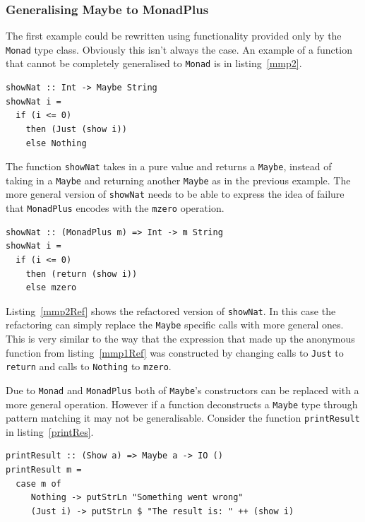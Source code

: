 \subsubsection{Generalising Maybe to MonadPlus} 

The first example could be rewritten using functionality provided only by the \texttt{Monad} type class. Obviously this isn't always the case. An example of a function that cannot be completely generalised to \texttt{Monad} is in listing~\ref{mmp2}.

\begin{lstlisting}[caption={\texttt{showNat}}, label=mmp2]
showNat :: Int -> Maybe String
showNat i =
  if (i <= 0)
    then (Just (show i))
    else Nothing
\end{lstlisting}

The function \texttt{showNat} takes in a pure value and returns a \texttt{Maybe}, instead of taking in a \texttt{Maybe} and returning another \texttt{Maybe} as in the previous example. The more general version of \texttt{showNat} needs to be able to express the idea of failure that \texttt{MonadPlus} encodes with the \texttt{mzero} operation. 

\begin{lstlisting}[caption={\texttt{showNat} refactored}, label=mmp2Ref]
showNat :: (MonadPlus m) => Int -> m String
showNat i =
  if (i <= 0)
    then (return (show i))
    else mzero
\end{lstlisting}
 
Listing~\ref{mmp2Ref} shows the refactored version of \texttt{showNat}. In this case the refactoring can simply replace the \texttt{Maybe} specific calls with more general ones. This is very similar to the way that the expression that made up the anonymous function from listing~\ref{mmp1Ref} was constructed by changing calls to \texttt{Just} to \texttt{return} and calls to \texttt{Nothing} to \texttt{mzero}. 

Due to \texttt{Monad} and \texttt{MonadPlus} both of \texttt{Maybe}'s constructors can be replaced with a more general operation. However if a function deconstructs a \texttt{Maybe} type through pattern matching it may not be generalisable. Consider the function \texttt{printResult} in listing~\ref{printRes}.

\begin{lstlisting}[caption={\texttt{printResult}},label=printRes]
printResult :: (Show a) => Maybe a -> IO ()
printResult m =
  case m of
     Nothing -> putStrLn "Something went wrong"
     (Just i) -> putStrLn $ "The result is: " ++ (show i)
\end{lstlisting}

